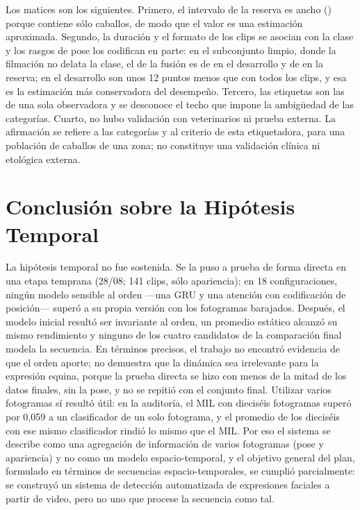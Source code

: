 Los matices son los siguientes. Primero, el intervalo de la reserva es ancho (\FusionReservaIC{}) porque contiene sólo \CaballosReserva{} caballos, de modo que el valor es una estimación aproximada. Segundo, la duración y el formato de los clips se asocian con la clase y los rasgos de pose los codifican en parte: en el subconjunto limpio, donde la filmación no delata la clase, el \fmacro{} de la fusión es de \FusionLimpioF{} en el desarrollo y de \FusionReservaLimpio{} en la reserva; en el desarrollo son unos 12 puntos menos que con todos los clips, y esa es la estimación más conservadora del desempeño. Tercero, las etiquetas son las de una sola observadora y se desconoce el techo que impone la ambigüedad de las categorías. Cuarto, no hubo validación con veterinarios ni prueba externa. La afirmación se refiere a las categorías y al criterio de esta etiquetadora, para una población de caballos de una zona; no constituye una validación clínica ni etológica externa.

\section{Conclusión sobre la Hipótesis Temporal}
La hipótesis temporal no fue sostenida. Se la puso a prueba de forma directa en una etapa temprana (28/08; 141 clips, sólo apariencia): en 18 configuraciones, ningún modelo sensible al orden ---una GRU y una atención con codificación de posición--- superó a su propia versión con los fotogramas barajados. Después, el modelo inicial resultó ser invariante al orden, un promedio estático alcanzó su mismo rendimiento y ninguno de los cuatro candidatos de la comparación final modela la secuencia. En términos precisos, el trabajo no encontró evidencia de que el orden aporte; no demuestra que la dinámica sea irrelevante para la expresión equina, porque la prueba directa se hizo con menos de la mitad de los datos finales, sin la pose, y no se repitió con el conjunto final. Utilizar varios fotogramas sí resultó útil: en la auditoría, el MIL con dieciséis fotogramas superó por 0,059 a un clasificador de un solo fotograma, y el promedio de los dieciséis con ese mismo clasificador rindió lo mismo que el MIL. Por eso el sistema se describe como una agregación de información de varios fotogramas (pose y apariencia) y no como un modelo espacio-temporal, y el objetivo general del plan, formulado en términos de secuencias espacio-temporales, se cumplió parcialmente: se construyó un sistema de detección automatizada de expresiones faciales a partir de video, pero no uno que procese la secuencia como tal.

